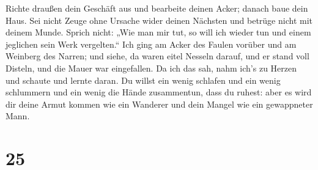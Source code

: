 Richte draußen dein Geschäft aus und bearbeite deinen Acker; danach baue
dein Haus.  Sei nicht Zeuge ohne Ursache wider deinen
Nächsten und betrüge nicht mit deinem Munde.  Sprich
nicht: „Wie man mir tut, so will ich wieder tun und einem jeglichen sein
Werk vergelten.``  Ich ging am Acker des Faulen vorüber
und am Weinberg des Narren;  und siehe, da waren eitel
Nesseln darauf, und er stand voll Disteln, und die Mauer war
eingefallen.  Da ich das sah, nahm ich's zu Herzen und
schaute und lernte daran.  Du willst ein wenig schlafen
und ein wenig schlummern und ein wenig die Hände zusammentun, dass du
ruhest:  aber es wird dir deine Armut kommen wie ein
Wanderer und dein Mangel wie ein gewappneter Mann.

\hypertarget{section-24}{%
\section{25}\label{section-24}}

